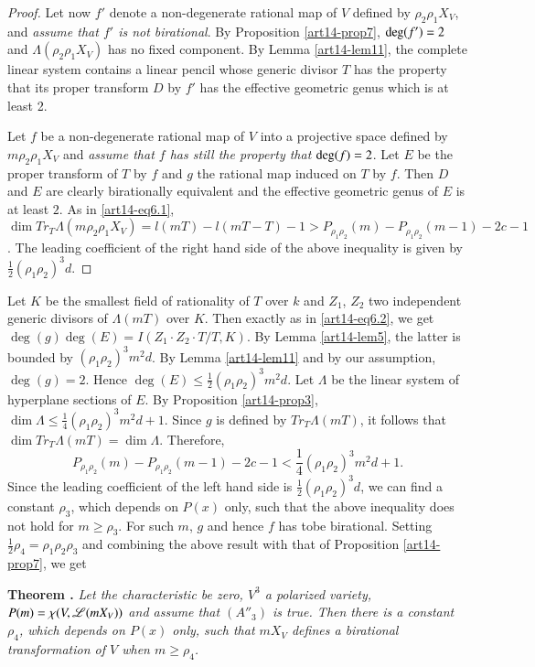 \begin{proof}
Let now $f'$ denote a non-degenerate rational map of $V$ defined by $\rho_{2}\rho_{1}X_{V}$, and {\em assume that $f'$ is not birational}. By Proposition \ref{art14-prop7}, $\deg\break (f')=2$ and $\Lambda(\rho_{2}\rho_{1}X_{V})$ has no fixed component. By Lemma \ref{art14-lem11}, the complete linear system contains a linear pencil whose generic divisor $T$ has the property that its proper transform $D$ by $f'$ has the effective geometric genus which is at least 2.

Let $f$ be a non-degenerate rational map of $V$ into a projective space defined by $m\rho_{2}\rho_{1}X_{V}$ and {\em assume that $f$ has still the property that $\deg\break (f)=2$}. Let $E$ be the proper transform of $T$ by $f$ and $g$ the rational map induced on $T$ by $f$. Then $D$ and $E$ are clearly birationally equivalent and the effective geometric genus of $E$ is at least $2$. As in \eqref{art14-eq6.1}, $\dim Tr_{T}\Lambda(m\rho_{2}\rho_{1}X_{V})=l(mT)-l(mT-T)-1>P_{\rho_{1}\rho_{2}}(m)-P_{\rho_{1}\rho_{2}}(m-1)-2c-1$. The leading coefficient of the right hand side of the above inequality is given by $\frac{1}{2}(\rho_{1}\rho_{2})^{3}d$.
\end{proof}

Let $K$ be the smallest field of rationality of $T$ over $k$ and $Z_{1}$, $Z_{2}$ two independent generic divisors of $\Lambda(mT)$ over $K$. Then exactly as in \eqref{art14-eq6.2}, we get $\deg(g)\deg(E)=I(Z_{1}\cdot Z_{2}\cdot T/T,K)$. By Lemma \ref{art14-lem5}, the latter is bounded by $(\rho_{1}\rho_{2})^{3}m^{2}d$. By Lemma \ref{art14-lem11} and by our assumption, $\deg(g)=2$. Hence $\deg(E)\leq \frac{1}{2}(\rho_{1}\rho_{2})^{3}m^{2}d$. Let $\Lambda$ be the linear system of hyperplane sections of $E$. By Proposition \ref{art14-prop3}, $\dim \Lambda\leq \frac{1}{4}(\rho_{1}\rho_{2})^{3}m^{2}d+1$. Since $g$ is defined by $Tr_{T}\Lambda (mT)$, it follows that $\dim Tr_{T}\Lambda(mT)=\dim \Lambda$. Therefore,
$$
P_{\rho_{1}\rho_{2}}(m)-P_{\rho_{1}\rho_{2}}(m-1)-2c-1<\frac{1}{4}(\rho_{1}\rho_{2})^{3}m^{2}d+1.
$$
Since the leading coefficient of the left hand side is $\frac{1}{2}(\rho_{1}\rho_{2})^{3}d$, we can find a constant $\rho_{3}$, which depends on $P(x)$ only, such that the above inequality does not hold for $m\geq \rho_{3}$. For such $m$, $g$ and hence $f$ has to\pageoriginale be birational. Setting $\frac{1}{2}\rho_{4}=\rho_{1}\rho_{2}\rho_{3}$ and combining the above result with that of Proposition \ref{art14-prop7}, we get

\medskip
\noindent
{\bf Theorem .\label{art14-thm1}}
{\em Let the characteristic be zero, $V^{3}$ a polarized variety, $P(m)\break =\chi(V,\mathscr{L}(mX_{V}))$ and assume that $(A''_{3})$ is true. Then there is a constant $\rho_{4}$, which depends on $P(x)$ only, such that $mX_{V}$ defines a birational transformation of $V$ when $m\geq \rho_{4}$.}

